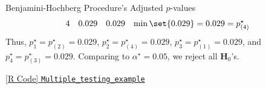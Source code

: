 \begin{itemize}
\begin{itemize}
\begin{Example}{Benjamini-Hochberg Procedure's Adjusted $ p $-values}{}
\[\begin{array}{cccl}
                                          4 & 0.029   & 0.029       & \min\set{0.029}=0.029=p_{(4)}^\star
                                    \end{array} \]
                              Thus, $ p_1^\star=p_{(2)}^\star=0.029 $, $ p_2^\star=p_{(4)}^\star=0.029 $, $ p_3^\star=p_{(1)}^\star=0.029 $,
                              and $ p_4^\star=p_{(3)}^\star=0.029 $. Comparing to $ \alpha^\star=0.05 $,
                              we reject all $ \mathbf{H}_{0} $'s.
                        \end{Example}
            \end{itemize}
\end{itemize}
\href{https://github.com/Hextical/university-notes/blob/master/year-3/semester-3/STAT 430/code/Multiple_testing_example.R}{[R Code] \texttt{Multiple\_testing\_example}}
